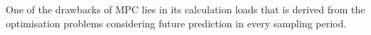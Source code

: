 One of the drawbacks of MPC lies in its calculation loads that is derived from the optimisation problems considering future prediction in every sampling period.